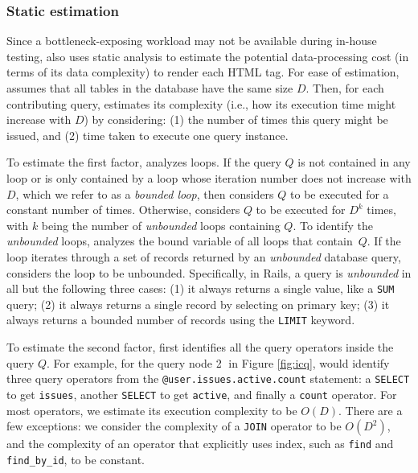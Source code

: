 \subsubsection{Static estimation}
\label{sec:profile_static}
Since a bottleneck-exposing workload may not be available during in-house testing, \Tool also
uses static analysis to estimate the potential data-processing cost (in terms of its data complexity) to render each HTML tag.
For ease of estimation, \Tool assumes that all tables in the database have the same size $D$. 
Then, for each contributing query, \Tool estimates its complexity (i.e., how its execution
time might increase with $D$) by considering:
(1) the number of times this query might be issued, and
(2) time taken to execute one query instance.

To estimate the first factor, \Tool analyzes loops.
If the query $Q$ is not contained in any loop or is only contained by a loop whose 
iteration number does not increase with $D$, which we refer to as a {\it bounded loop}, 
\Tool then considers $Q$ to be executed for a constant number of times.
Otherwise, \Tool considers $Q$ to be executed for $D^k$ times, with $k$ being the number of {\it unbounded} loops containing $Q$.
To identify the {\it unbounded} loops, \Tool analyzes the bound variable 
of all loops that contain\ $Q$.
If the loop iterates through a set of records returned by an 
{\it unbounded} database query,
\Tool considers the loop to be unbounded.
Specifically, in Rails, a query is {\it unbounded} in all but the following
three cases:
(1) it always returns a single value, like a {\tt SUM} query; 
(2) it always returns a single record by selecting on primary key; %
(3) it always returns a bounded number of records using the {\tt LIMIT} keyword.

To estimate the second factor, \Tool first identifies all the query operators
inside the query $Q$. For example, for the query node {\large \textcircled{\small 2}} in
Figure \ref{fig:icq}, \Tool would identify three query operators 
from the {\tt @user.issues.active.count} statement: 
a {\tt SELECT} to get {\tt issues}, 
another {\tt SELECT} to get {\tt active}, and finally a {\tt count} operator.
For most operators, we estimate its execution complexity to be $O(D)$.
There are a few exceptions:
we consider the complexity of a {\tt JOIN} operator to be $O(D^2)$, and 
the complexity of an operator that explicitly uses index, such as
{\tt find} and {\tt find\_by\_id}, to be constant. 

